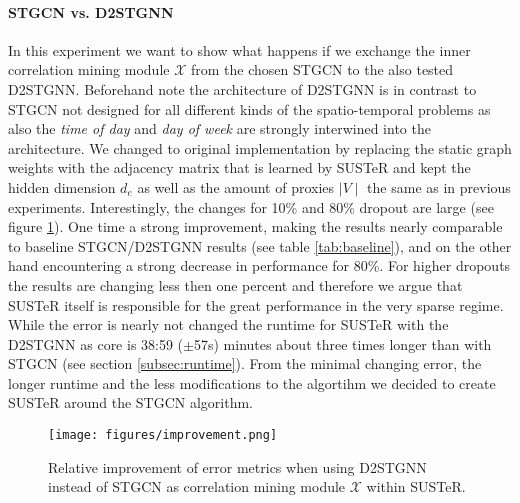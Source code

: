 \paragraph{\textbf{STGCN vs. D2STGNN}}
In this experiment we want to show what happens if we exchange the inner correlation mining module $\mathcal{X}$ from the chosen STGCN to the also tested D2STGNN.
Beforehand note the architecture of D2STGNN is in contrast to STGCN not designed for all different kinds of the spatio-temporal problems as also the \textit{time of day} and \textit{day of week} are strongly interwined into the architecture.
We changed to original implementation by replacing the static graph weights with the adjacency matrix that is learned by SUSTeR and kept the hidden dimension $d_e$ as well as the amount of proxies $\mid V \mid$ the same as in previous experiments.
Interestingly, the changes for 10\% and 80\% dropout are large (see figure \ref{fig:improvement}). 
One time a strong improvement, making the results nearly comparable to baseline STGCN/D2STGNN results (see table \ref{tab:baseline}), and on the other hand encountering a strong decrease in performance for $80\%$.
For higher dropouts the results are changing less then one percent and therefore we argue that SUSTeR itself is responsible for the great performance in the very sparse regime.
While the error is nearly not changed the runtime for SUSTeR with the D2STGNN as core is 38:59 ($\pm$57s) minutes about three times longer than with STGCN (see section \ref{subsec:runtime}).
From the minimal changing error, the longer runtime and the less modifications to the algortihm we decided to create SUSTeR around the STGCN algorithm.



\begin{figure}[ht]
    \centering
    \texttt{[image: figures/improvement.png]}
    \caption{Relative improvement of error metrics when using D2STGNN instead of STGCN as correlation mining module $\mathcal{X}$ within SUSTeR.}
    \label{fig:improvement}
\end{figure}



